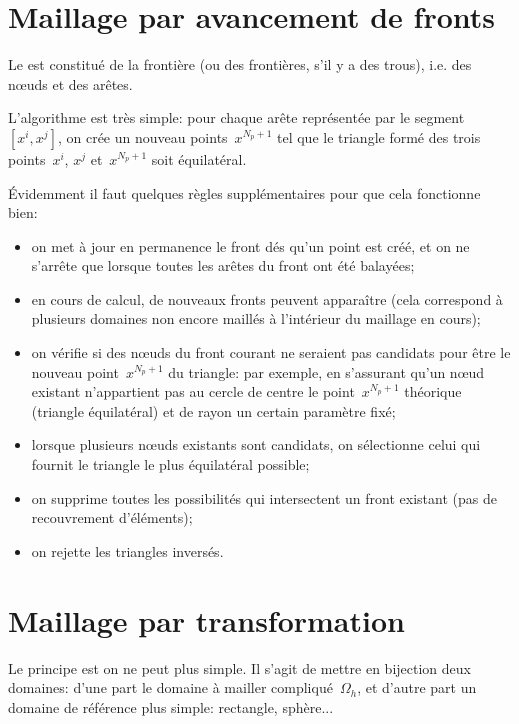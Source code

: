 \medskip
\section{Maillage par avancement de fronts}\label{Sec-MeshFront}

Le  est constitué de la frontière (ou des frontières, s'il y a des trous), i.e. des nœuds et des arêtes.

L'algorithme est très simple: pour chaque arête représentée par le segment~$[x^i,x^j]$, on crée un nouveau points~$x^{N_p+1}$ tel que le triangle formé des trois points~$x^i$, $x^j$ et~$x^{N_p+1}$ soit équilatéral.

\medskip
Évidemment il faut quelques règles supplémentaires pour que cela fonctionne bien:
\begin{itemize}
   \item on met à jour en permanence le front dés qu'un point est créé, et on ne s'arrête que lorsque toutes les arêtes du front ont été balayées;
   \item en cours de calcul, de nouveaux fronts peuvent apparaître (cela correspond à plusieurs domaines non encore maillés à l'intérieur du maillage en cours);
   \item on vérifie si des nœuds du front courant ne seraient pas candidats pour être le nouveau point~$x^{N_p+1}$ du triangle: par exemple, en s'assurant qu'un nœud existant n'appartient pas au cercle de centre le point~$x^{N_p+1}$ théorique (triangle équilatéral) et de rayon un certain paramètre fixé;
   \item lorsque plusieurs nœuds existants sont candidats, on sélectionne celui qui fournit le triangle le plus équilatéral possible;
   \item on supprime toutes les possibilités qui intersectent un front existant (pas de recouvrement d'éléments);
   \item on rejette les triangles inversés.
\end{itemize}


\medskip
\section{Maillage par transformation}\label{Sec-MeshTransfo}

Le principe est on ne peut plus simple. Il s'agit de mettre en bijection deux domaines: d'une part le domaine à mailler compliqué~$\Omega_h$, et d'autre part un domaine de référence plus simple: rectangle, sphère...

